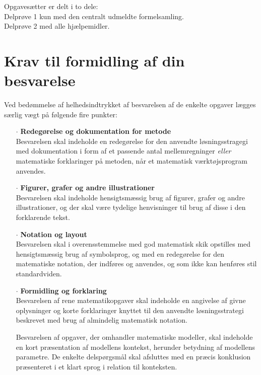 \documentclass[12pt,x11names,a4paper]{article}
\begin{document}


\begin{center}
Opgavesætter er delt i to dele:\\
Delprøve 1 kun med den centralt udmeldte formelsamling.\\
Delprøve 2 med alle hjælpemidler.
\end{center}

\section*{Krav til formidling af din besvarelse}

Ved bedømmelse af helhedsindtrykket af besvarelsen af de enkelte opgaver lægges særlig vægt på følgende fire punkter:
\begin{itemize}
\item[$\cdot$] \textbf{Redegørelse og dokumentation for metode} \\
Besvarelsen skal indeholde en redegørelse for den anvendte løsningsstragegi med dokumentation i form af et passende antal mellemregninger \textit{eller} matematiske forklaringer på metoden, når et matematisk værktøjsprogram anvendes.
\item[$\cdot$] \textbf{Figurer, grafer og andre illustrationer} \\
Besvarelsen skal indeholde hensigtsmæssig brug af figurer, grafer og andre illustrationer, og der skal være tydelige henvisninger til brug af disse i den forklarende tekst.
\item[$\cdot$] \textbf{Notation og layout}\\
Besvarelsen skal i overensstemmelse med god matematisk skik opstilles med hensigtsmæssig brug af symbolsprog, og med en redegørelse for den matematiske notation, der indføres og anvendes, og som ikke kan henføres stil standardviden.
\item[$\cdot$] \textbf{Formidling og forklaring}\\
Besvarelsen af rene matematikopgaver skal indeholde en angivelse af givne oplysninger og korte forklaringer knyttet til den anvendte løsningsstrategi beskrevet med brug af almindelig matematisk notation. 

Besvarelsen af opgaver, der omhandler matematiske modeller, skal indeholde en kort præsentation af modellens kontekst, herunder betydning af modellens parametre. De enkelte delspørgsmål skal afsluttes med en præcis konklusion præsenteret i et klart sprog i relation til konteksten.
\end{itemize}
\end{document}
